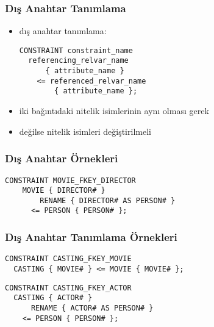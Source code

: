 \documentclass[dvipsnames]{beamer}
\theoremstyle{plain}
\begin{document}
\begin{frame}[fragile]
  \frametitle{Dış Anahtar Tanımlama}
  
  \begin{itemize}
    \item dış anahtar tanımlama:
    \begin{lstlisting}
CONSTRAINT constraint_name
  referencing_relvar_name
      { attribute_name }
    <= referenced_relvar_name
        { attribute_name };
    \end{lstlisting}

    \item  iki bağıntıdaki nitelik isimlerinin aynı olması gerek
     \item değilse nitelik isimleri değiştirilmeli
  \end{itemize}
\end{frame}

\begin{frame}[fragile]
  \frametitle{Dış Anahtar Örnekleri}
  
  \begin{lstlisting}
CONSTRAINT MOVIE_FKEY_DIRECTOR
    MOVIE { DIRECTOR# }
        RENAME { DIRECTOR# AS PERSON# }
      <= PERSON { PERSON# };
  \end{lstlisting}
\end{frame}

\begin{frame}[fragile]
  \frametitle{Dış Anahtar Tanımlama Örnekleri}

  \begin{lstlisting}
CONSTRAINT CASTING_FKEY_MOVIE
  CASTING { MOVIE# } <= MOVIE { MOVIE# };
  \end{lstlisting}

  \begin{lstlisting}
CONSTRAINT CASTING_FKEY_ACTOR
  CASTING { ACTOR# }
      RENAME { ACTOR# AS PERSON# }
    <= PERSON { PERSON# };
  \end{lstlisting}
\end{frame}
\end{document}
